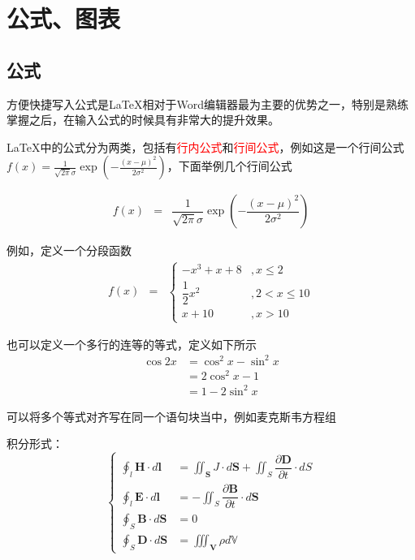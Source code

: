 \newcommand{\red}[1]{{\textcolor{red}{#1}}}%
\newcommand{\argmin}{\mathop{\mathrm{argmin}}\limits}
\newcommand{\argmax}{\mathop{\mathrm{argmax}}\limits}
\chapter{公式、图表}
\section{公式}

方便快捷写入公式是\LaTeX 相对于Word编辑器最为主要的优势之一，特别是熟练掌握之后，在输入公式的时候具有非常大的提升效果。


\LaTeX 中的公式分为两类，包括有\red{行内公式}和\red{行间公式}，例如这是一个行间公式$f(x)=\frac{1}{\sqrt{2\pi}\sigma}\exp\left(-\frac{(x-\mu)^{2}}{2\sigma^{2}}\right)$，下面举例几个行间公式

\begin{eqnarray}
    f(x)&=&\dfrac{1}{\sqrt{2\pi}\sigma}\exp\left(-\dfrac{(x-\mu)^{2}}{2\sigma^{2}}\right)    
\end{eqnarray}

例如，定义一个分段函数
\begin{eqnarray}
    f(x)&=&\begin{cases}
        -x^{3}+x+8&,x\leq{2}\\
        \dfrac{1}{2}x^{2}&,2<x\leq{10}\\
        x+10&,x>10
    \end{cases}
\end{eqnarray}

也可以定义一个多行的连等的等式，定义如下所示
\begin{eqnarray}
    \cos{2x}&=\cos^{2}x-\sin^{2}x\\
        &=2\cos^{2}x-1\\
        &=1-2\sin^{2}x
\end{eqnarray}

可以将多个等式对齐写在同一个语句块当中，例如麦克斯韦方程组

积分形式：
\begin{equation}
    \begin{cases}
        \displaystyle\oint_{l}\mathbf{H}\cdot{d}\mathbf{l}&=\displaystyle\iint_\mathbf{S}J\cdot{d}\mathbf{S}+\displaystyle\iint_{S}\dfrac{\partial\mathbf{D}}{\partial{t}}\cdot{dS}\\
        \displaystyle\oint_{l}\mathbf{E}\cdot{d}\mathbf{l}&=-\displaystyle\iint_{S}\dfrac{\partial\mathbf{B}}{\partial{t}}\cdot{d}\mathbf{S}\\
        \displaystyle\oint_{S}\mathbf{B}\cdot{d}\mathbf{S}&=0\\
        \displaystyle\oint_{S}\mathbf{D}\cdot{d}\mathbf{S}&=\displaystyle\iiint_\mathbf{V}\rho{d}\mathbb{V}
    \end{cases}
\end{equation}

